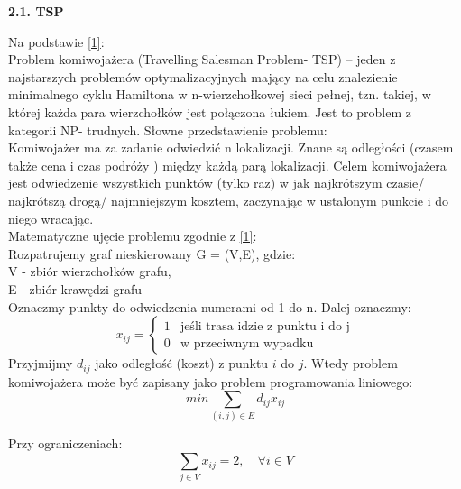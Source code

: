 \documentclass[a4paper, twoside, 12pt, justified]{article}
\begin{document}
	\begin{flushleft}
		\begin{large}
			\textbf{2.1. TSP}
		\end{large}
	\end{flushleft}
	\vspace{5mm} %

	
	Na podstawie \hyperlink{komiwojazer}{[1]}:\\
	Problem komiwojażera (Travelling Salesman Problem- TSP) – jeden z najstarszych problemów optymalizacyjnych mający na celu znalezienie minimalnego cyklu Hamiltona w n-wierzchołkowej sieci pełnej, tzn. takiej, w której każda para wierzchołków jest połączona łukiem. Jest to problem z kategorii NP- trudnych. Słowne przedstawienie problemu:\\ 
	Komiwojażer ma za zadanie odwiedzić n lokalizacji. Znane są odległości (czasem także cena i czas podróży ) między każdą parą lokalizacji.
	Celem komiwojażera jest odwiedzenie wszystkich punktów (tylko raz) w jak najkrótszym czasie/ najkrótszą drogą/ najmniejszym kosztem, zaczynając w ustalonym punkcie i do niego wracając.\\
	Matematyczne ujęcie problemu zgodnie z \hyperlink{tsp_math_model}{[1]}:\\
	Rozpatrujemy graf nieskierowany G = (V,E), gdzie: \\
	V - zbiór wierzchołków grafu,\\
	E - zbiór krawędzi grafu\\
	Oznaczmy punkty do odwiedzenia numerami od 1 do n. Dalej oznaczmy:
	\[ x_{ij} = 
	\begin{cases}
	1 &\mbox{jeśli trasa idzie z punktu i do j} \\
	0 &\mbox{w przeciwnym wypadku}
	\end{cases}
	\]
	Przyjmijmy $d_{ij}$ jako odległość (koszt) z punktu $i$ do $j$. Wtedy problem komiwojażera może być zapisany jako problem programowania liniowego:\\
	  
	  \begin{equation}
		  {min \sum\limits_{(i,j) \in E} d_{ij}x_{ij}}
	  \end{equation}
	  
	  Przy ograniczeniach:\\
	  
	  \begin{equation}
	  	  {\sum\limits_{j \in V} x_{ij} = 2}, \quad \forall i \in V
	  \end{equation}
	  
\end{document}

